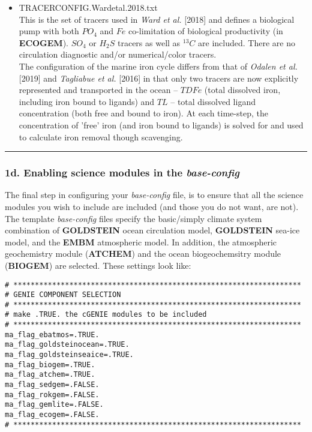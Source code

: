 \begin{itemize}[noitemsep]
\vspace{2mm}
\item \textsf{\small TRACERCONFIG.Wardetal.2018.txt}
\vspace{1mm}
\\This is the set of tracers used in \textit{Ward et al.} [2018] and defines a biological pump with both \(PO_{4}\) and \(Fe\) co-limitation of biological productivity (in \textbf{ECOGEM}). \(SO_{4}\) or \(H_{2}S\) tracers as well as \(^{13}C\) are included. There are no circulation diagnostic and/or numerical/color tracers.
\\The configuration of the marine iron cycle differs from that of \textit{Odalen et al.} [2019] and \textit{Tagliabue et al.} [2016] in that only two tracers are now explicitly represented and transported in the ocean -- \(TDFe\) (total dissolved iron, including iron bound to ligands) and \(TL\) -- total dissolved ligand concentration (both free and bound to iron). At each time-step, the concentration of 'free' iron (and iron bound to ligands) is solved for and used to calculate iron removal though scavenging.

\end{itemize}

%
\noindent\rule{4cm}{0.5pt}
\subsubsection{1d. Enabling science modules in the \textit{base-config}}

The final step in configuring your \textit{base-config} file, is to ensure that all the science modules you wish to include are included (and those you do not want, are not). The template \textit{base-config} files specify the basic/simply climate system combination of \textbf{GOLDSTEIN} ocean circulation model, \textbf{GOLDSTEIN} sea-ice model, and the \textbf{EMBM} atmospheric model. In addition, the atmospheric geochemistry module (\textbf{ATCHEM}) and the ocean biogeochemsitry module (\textbf{BIOGEM}) are selected. These settings look like:

\footnotesize\vspace{-2pt}\begin{verbatim}
# *******************************************************************
# GENIE COMPONENT SELECTION
# *******************************************************************
# make .TRUE. the cGENIE modules to be included
# *******************************************************************
ma_flag_ebatmos=.TRUE.
ma_flag_goldsteinocean=.TRUE.
ma_flag_goldsteinseaice=.TRUE.
ma_flag_biogem=.TRUE.
ma_flag_atchem=.TRUE.
ma_flag_sedgem=.FALSE.
ma_flag_rokgem=.FALSE.
ma_flag_gemlite=.FALSE.
ma_flag_ecogem=.FALSE.
# *******************************************************************
\end{verbatim}\vspace{-2pt}\normalsize

